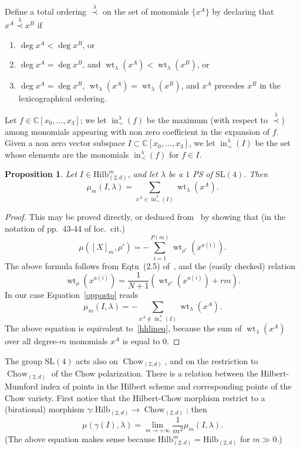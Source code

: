 \documentclass[11pt]{amsart}
\numberwithin{equation}{section}
\theoremstyle{plain}
\newtheorem{proposition}[theorem]{Proposition}
\theoremstyle{remark}
\theoremstyle{definition}
\newcommand{\Hilb}{\mathrm{Hilb}}
\newcommand{\SL}{\mathrm{SL}}
\newcommand{\CC}{{\mathbb C}}
\DeclareMathOperator{\Chow}{Chow}
\DeclareMathOperator{\initial}{in}
\DeclareMathOperator{\weight}{wt}
\begin{document}
Define a total ordering $\overset{\lambda}{\prec}$ on the set of monomials $\{x^A\}$ by declaring that $x^A \overset{\lambda}{\prec} x^B$ if
%
\begin{enumerate}
%
\item
%
$\deg x^A<\deg x^B$, or
%
\item
%
$\deg x^A=\deg x^B$, and $\weight_{\lambda}(x^A)<\weight_{\lambda}(x^B)$, or
%
\item
%
$\deg x^A=\deg x^B$,  $\weight_{\lambda}(x^A)=\weight_{\lambda}(x^B)$, and $x^A$ precedes $x^B$ in the lexicographical ordering.
%
\end{enumerate}
%
Let $f\in\CC[x_0,\ldots,x_3]$; we let  $\initial^{\lambda}_{\prec}(f)$ be the maximum (with respect to $\overset{\lambda}{\prec}$)   among monomials appearing with non zero coefficient in the expansion of $f$. 
Given a non zero vector  subspace $I\subset\CC[x_0,\ldots,x_3]$, we let  $\initial^{\lambda}_{\prec}(I)$ be the set whose elements are the monomials $\initial^{\lambda}_{\prec}(f)$ for $f\in I$. 
%
\begin{proposition}\label{prp:grobstab}
%
Let   $I\in\Hilb^m_{(2,d)}$, and let  $\lambda$ be a  $1$ PS of  $\SL(4)$. Then
%
\begin{equation}\label{hhlineq}
%
\mu_m(I,\lambda)=\sum_{x^A\in \initial^{\lambda}_{\prec}(I)}\weight_{\lambda}(x^A).
%
\end{equation}
%
%
\end{proposition}
%
\begin{proof}
%
This may be proved directly, or deduced from~\cite{hhl-stab} by showing that (in the notation of pp.~43-44 of loc.~cit.)
%
\begin{equation}\label{opposto}
%
\mu([X]_m,\rho')=-\sum_{i=1}^{P(m)}\weight_{\rho'}(x^{a(i)}).
%
\end{equation}
%
The above formula follows from Eqtn~(2.5) of~\cite{hhl-stab}, and the (easily checked) relation
%
\begin{equation*}
%
\weight_{\rho}(x^{a(i)})=\frac{1}{N+1}(\weight_{\rho'}(x^{a(i)})+rm).
%
\end{equation*}
%
In our case Equation~\eqref{opposto} reads
%
\begin{equation}\label{opposto2}
%
\mu_m(I,\lambda)=-\sum_{x^A\notin \initial^{\lambda}_{\prec}(I)}\weight_{\lambda}(x^A).
%
\end{equation}
%
The above equation is equivalent to~\eqref{hhlineq}, because the sum of  $\weight_{\lambda}(x^A)$ over all degree-$m$ monomials $x^A$ is equal to $0$. 
%
\end{proof}
%
The group $\SL(4)$ acts also on  $\Chow_{(2,d)}$, and on the restriction  to  $\Chow_{(2,d)}$ of the Chow polarization. There is a relation between the Hilbert-Mumford index of points in the Hilbert scheme and corresponding points of the Chow variety. First notice that the Hilbert-Chow morphism restrict to a (birational) morphism $\gamma\colon \Hilb_{(2,d)}\to \Chow_{(2,d)}$; then 
%
\begin{equation}\label{chowlim}
%
\mu(\gamma(I),\lambda)=\lim_{m\to +\infty}\frac{1}{m^2}\mu_m(I,\lambda).
%
\end{equation}
%
(The above equation  makes sense because  $\Hilb^m_{(2,d)}=\Hilb_{(2,d)}$ for $m\gg 0$.)
\end{document}
